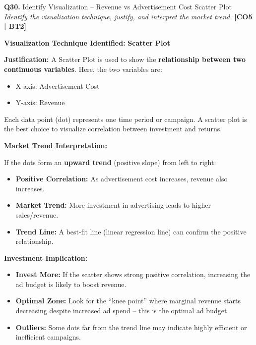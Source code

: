 \documentclass[12pt,a4paper]{article}
\newcommand{\Qno}[1]{\textbf{\color{darkred}Q#1.}}
\newcommand{\term}[1]{\textbf{\color{headingcolor}#1}}
\begin{document}
\vspace{8pt}

\begin{questionbox}{\Qno{30} Identify Visualization -- Revenue vs Advertisement Cost Scatter Plot}
\textit{Identify the visualization technique, justify, and interpret the market trend.} \hfill \textbf{[CO5 | BT2]}
\end{questionbox}

\begin{answerenv}

\textbf{\color{headingcolor}Visualization Technique Identified:} \term{Scatter Plot}

\textbf{\color{headingcolor}Justification:}
A Scatter Plot is used to show the \textbf{relationship between two continuous variables}. Here, the two variables are:
\begin{itemize}[leftmargin=1.5em]
  \item X-axis: Advertisement Cost
  \item Y-axis: Revenue
\end{itemize}
Each data point (dot) represents one time period or campaign. A scatter plot is the best choice to visualize correlation between investment and returns.

\vspace{6pt}
\textbf{\color{headingcolor}Market Trend Interpretation:}

If the dots form an \textbf{upward trend} (positive slope) from left to right:
\begin{itemize}[leftmargin=1.5em, itemsep=2pt]
  \item \term{Positive Correlation:} As advertisement cost increases, revenue also increases.
  \item \term{Market Trend:} More investment in advertising leads to higher sales/revenue.
  \item \term{Trend Line:} A best-fit line (linear regression line) can confirm the positive relationship.
\end{itemize}

\textbf{\color{headingcolor}Investment Implication:}
\begin{itemize}[leftmargin=1.5em, itemsep=2pt]
  \item \term{Invest More:} If the scatter shows strong positive correlation, increasing the ad budget is likely to boost revenue.
  \item \term{Optimal Zone:} Look for the ``knee point'' where marginal revenue starts decreasing despite increased ad spend -- this is the optimal ad budget.
  \item \term{Outliers:} Some dots far from the trend line may indicate highly efficient or inefficient campaigns.
\end{itemize}

\end{answerenv}
\end{document}
